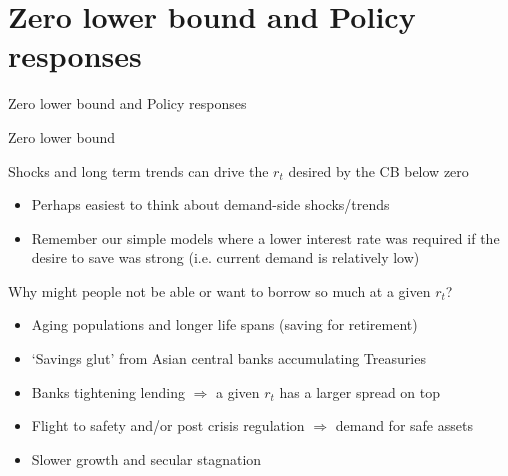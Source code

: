 \section{Zero lower bound and Policy responses}

\begin{frame}

\begin{center}
{\LARGE Zero lower bound and Policy responses}
\end{center}

\end{frame}


	
\begin{frame}{Zero lower bound}

Shocks and long term trends can drive the $r_{t}$ desired by the CB below zero
\begin{itemize}
\item	Perhaps easiest to think about demand-side shocks/trends
\item	Remember our simple models where a lower interest rate was required if the desire to save was strong (i.e. current demand is relatively low)
\end{itemize}

\vspace{3mm}
Why might people not be able or want to borrow so much at a given $r_{t}$?
\begin{itemize}
\item	Aging populations and longer life spans (saving for retirement)
\item	`Savings glut' from Asian central banks accumulating Treasuries
\item	Banks tightening lending $\Rightarrow$ a given $r_{t}$ has a larger spread on top
\item	Flight to safety and/or post crisis regulation $\Rightarrow$ demand for safe assets 
\item	Slower growth and secular stagnation
\end{itemize}

\end{frame}


